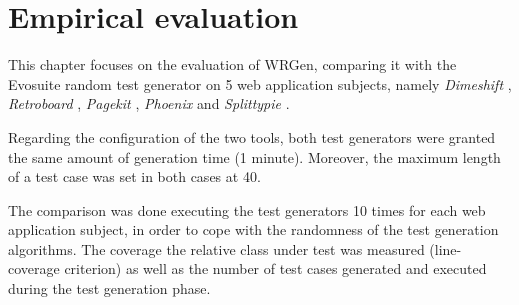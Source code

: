 \chapter{Empirical evaluation} \label{ch:EmpEvaluation}
This chapter focuses on the evaluation of WRGen, comparing it with the Evosuite random test generator on 5 web application subjects, namely \textit{Dimeshift} \cite{dimeshift}, \textit{Retroboard} \cite{retroboard}, \textit{Pagekit} \cite{pagekit}, \textit{Phoenix} \cite{phoenix} and \textit{Splittypie} \cite{splittypie}.

Regarding the configuration of the two tools, both test generators were granted the same amount of generation time (1 minute). Moreover, the maximum length of a test case was set in both cases at 40.

The comparison was done executing the test generators 10 times for each web application subject, in order to cope with the randomness of the test generation algorithms. The coverage the relative class under test was measured (line-coverage criterion) as well as the number of test cases generated and executed during the test generation phase. 




